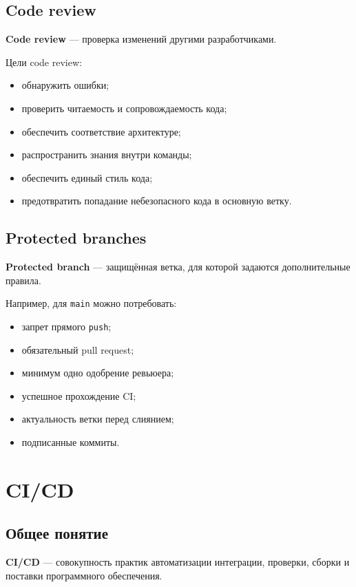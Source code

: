 \documentclass[12pt,a4paper]{article}
\begin{document}
\subsection{Code review}

\textbf{Code review} --- проверка изменений другими разработчиками.

Цели code review:

\begin{itemize}
    \item обнаружить ошибки;
    \item проверить читаемость и сопровождаемость кода;
    \item обеспечить соответствие архитектуре;
    \item распространить знания внутри команды;
    \item обеспечить единый стиль кода;
    \item предотвратить попадание небезопасного кода в основную ветку.
\end{itemize}

\subsection{Protected branches}

\textbf{Protected branch} --- защищённая ветка, для которой задаются дополнительные правила.

Например, для \texttt{main} можно потребовать:

\begin{itemize}
    \item запрет прямого \texttt{push};
    \item обязательный pull request;
    \item минимум одно одобрение ревьюера;
    \item успешное прохождение CI;
    \item актуальность ветки перед слиянием;
    \item подписанные коммиты.
\end{itemize}

\section{CI/CD}

\subsection{Общее понятие}

\textbf{CI/CD} --- совокупность практик автоматизации интеграции, проверки, сборки и поставки программного обеспечения.
\end{document}
